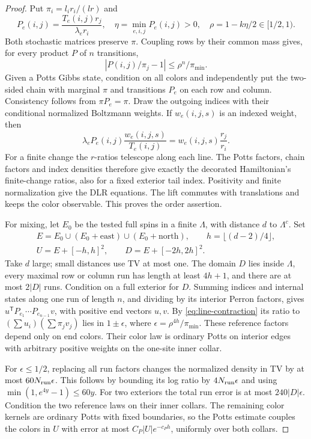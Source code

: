 \begin{proof}
Put \(\pi_i=l_ir_i/(lr)\) and
\[
P_e(i,j)=\frac{T_e(i,j)r_j}{\lambda_er_i},\quad
\eta=\min_{e,i,j}P_e(i,j)>0,\quad \rho=1-k\eta/2\in[1/2,1).
\]
Both stochastic matrices preserve \(\pi\). Coupling rows by their common mass gives, for every product \(P\) of \(n\) transitions,
\begin{equation}\label{eq:line-contraction}
|P(i,j)/\pi_j-1|\le\rho^n/\pi_{\min}.
\end{equation}
Given a Potts Gibbs state, condition on all colors and independently put the two-sided chain with marginal \(\pi\) and transitions \(P_e\) on each row and column. Consistency follows from \(\pi P_e=\pi\). Draw the outgoing indices with their conditional normalized Boltzmann weights. If \(w_e(i,j,s)\) is an indexed weight, then
\[
\lambda_eP_e(i,j)\frac{w_e(i,j,s)}{T_e(i,j)}
=w_e(i,j,s)\frac{r_j}{r_i}.
\]
For a finite change the \(r\)-ratios telescope along each line. The Potts factors, chain factors and index densities therefore give exactly the decorated Hamiltonian's finite-change ratios, also for a fixed exterior tail index. Positivity and finite normalization give the DLR equations. The lift commutes with translations and keeps the color observable. This proves the order assertion.

For mixing, let \(E_0\) be the tested full spins in a finite \(\Lambda\), with distance \(d\) to \(\Lambda^c\). Set
\[
\begin{gathered}
E=E_0\cup(E_0+\text{east})\cup(E_0+\text{north}),\qquad
h=\lfloor(d-2)/4\rfloor,\\
U=E+[-h,h]^2,\qquad D=E+[-2h,2h]^2.
\end{gathered}
\]
Take \(d\) large; small distances use TV at most one. The domain \(D\) lies inside \(\Lambda\), every maximal row or column run has length at least \(4h+1\), and there are at most \(2|D|\) runs. Condition on a full exterior for \(D\). Summing indices and internal states along one run of length \(n\), and dividing by its interior Perron factors, gives
\(u^{\mathsf T}P_{e_1}\cdots P_{e_{n-1}}v\), with positive end vectors \(u,v\). By \eqref{eq:line-contraction} its ratio to \((\sum u_i)(\sum\pi_jv_j)\) lies in \(1\pm\epsilon\), where \(\epsilon=\rho^{4h}/\pi_{\min}\). These reference factors depend only on end colors. Their color law is ordinary Potts on interior edges with arbitrary positive weights on the one-site inner collar.

For \(\epsilon\le1/2\), replacing all run factors changes the normalized density in TV by at most \(60N_{\rm run}\epsilon\). This follows by bounding its log ratio by \(4N_{\rm run}\epsilon\) and using \(\min(1,e^{4y}-1)\le60y\). For two exteriors the total run error is at most \(240|D|\epsilon\). Condition the two reference laws on their inner collars. The remaining color kernels are ordinary Potts with fixed boundaries, so the Potts estimate couples the colors in \(U\) with error at most \(C_P|U|e^{-c_Ph}\), uniformly over both collars.


\end{proof}
